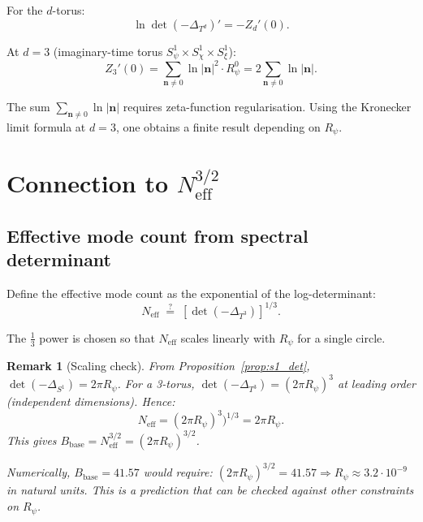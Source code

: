 \documentclass[11pt,a4paper]{article}
\newtheorem{remark}{Remark}
\begin{document}
For the $d$-torus:
\begin{equation}
\label{eq:td_det}
  \ln\det(-\Delta_{T^d})' = -Z_d'(0).
\end{equation}

At $d = 3$ (imaginary-time torus $S^1_\psi \times S^1_\chi \times S^1_\xi$):
\begin{equation}
\label{eq:z3_s0}
  Z_3'(0) = \sum_{\mathbf{n}\neq 0} \ln |\mathbf{n}|^2 \cdot R_\psi^0
  = 2 \sum_{\mathbf{n}\neq 0} \ln|\mathbf{n}|.
\end{equation}

The sum $\sum_{\mathbf{n}\neq 0}\ln|\mathbf{n}|$ requires zeta-function
regularisation.  Using the Kronecker limit formula at $d=3$, one obtains
a finite result depending on $R_\psi$.

\section{Connection to \texorpdfstring{$N_{\mathrm{eff}}^{3/2}$}{Neff32}}
\label{sec:neff}

\subsection{Effective mode count from spectral determinant}

Define the effective mode count as the exponential of the log-determinant:
\begin{equation}
\label{eq:neff_def}
  N_{\mathrm{eff}} \;\stackrel{?}{=}\; [\det(-\Delta_{T^3})]^{1/3}.
\end{equation}

The $\tfrac{1}{3}$ power is chosen so that $N_{\mathrm{eff}}$ scales linearly
with $R_\psi$ for a single circle.

\begin{remark}[Scaling check]
  From Proposition~\ref{prop:s1_det}, $\det(-\Delta_{S^1}) = 2\pi R_\psi$.
  For a 3-torus, $\det(-\Delta_{T^3}) = (2\pi R_\psi)^3$ at leading order
  (independent dimensions).  Hence:
  \begin{equation}
    N_{\mathrm{eff}} = (2\pi R_\psi)^3)^{1/3} = 2\pi R_\psi.
  \end{equation}
  This gives $B_{\mathrm{base}} = N_{\mathrm{eff}}^{3/2} = (2\pi R_\psi)^{3/2}$.
  
  Numerically, $B_{\mathrm{base}} = 41.57$ would require:
  $(2\pi R_\psi)^{3/2} = 41.57 \Rightarrow R_\psi \approx 3.2 \cdot 10^{-9}$
  in natural units.  This is a prediction that can be checked against other
  constraints on $R_\psi$.
\end{remark}
\end{document}
